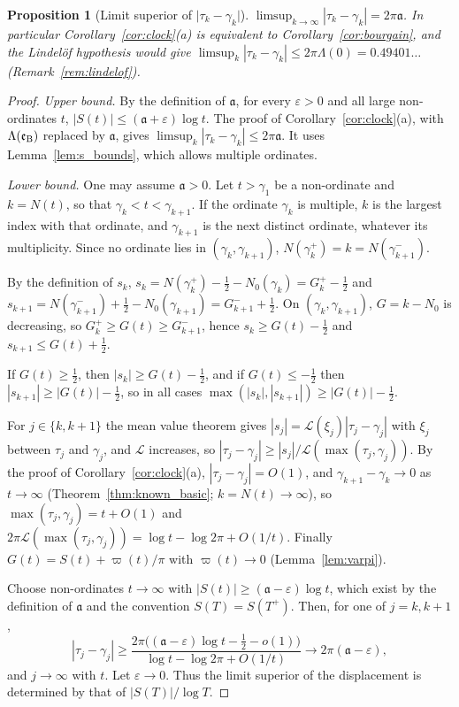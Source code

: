 \documentclass[11pt,a4paper]{article}
\makeatletter
\numberwithin{equation}{section}
\DeclareRobustCommand{\CGref}[1]{\ref{#1}}
\let\CG@origref\ref
\newcommand{\CG@gettip}[1]{\@ifundefined{CGTip@#1}{#1}{\csname CGTip@#1\endcsname}}
\DeclareRobustCommand{\CGref}[1]{\pdftooltip{\CG@origref{#1}}{\CG@gettip{#1}}}
\newtheorem{proposition}[theorem]{Proposition}
\theoremstyle{definition}
\theoremstyle{remark}
\newcommand{\Nz}{N_0} %
\newcommand{\lL}{\mathcal L}
\newcommand{\eB}{\mathfrak e_{\rm B}}
\makeatother
\begin{document}
\begin{proposition}[Limit superior of $\lvert\tau_k-\gamma_k\rvert$]\label{prop:clock_sharp}
$\limsup_{k\to\infty}|\tau_k-\gamma_k|=2\pi\mathfrak a$. In particular Corollary~\CGref{cor:clock}(a) is equivalent to Corollary~\CGref{cor:bourgain}, and the Lindel\"of hypothesis would give $\limsup_k|\tau_k-\gamma_k|\le2\pi\Lambda(0)=0.49401\ldots$ (Remark~\CGref{rem:lindelof}).
\end{proposition}

\begin{proof}
\emph{Upper bound.} By the definition of $\mathfrak a$, for every $\varepsilon>0$ and all large non-ordinates $t$, $|S(t)|\le(\mathfrak a+\varepsilon)\log t$. The proof of Corollary~\CGref{cor:clock}(a), with $\Lambda(\eB)$ replaced by $\mathfrak a$, gives $\limsup_k|\tau_k-\gamma_k|\le2\pi\mathfrak a$. It uses Lemma~\CGref{lem:s_bounds}, which allows multiple ordinates.

\emph{Lower bound.} One may assume $\mathfrak a>0$. Let $t>\gamma_1$ be a non-ordinate and $k=N(t)$, so that $\gamma_k<t<\gamma_{k+1}$. If the ordinate $\gamma_k$ is multiple, $k$ is the largest index with that ordinate, and $\gamma_{k+1}$ is the next distinct ordinate, whatever its multiplicity. Since no ordinate lies in $(\gamma_k,\gamma_{k+1})$, $N(\gamma_k^+)=k=N(\gamma_{k+1}^-)$.

By the definition of $s_k$, $s_k=N(\gamma_k^+)-\frac12-\Nz(\gamma_k)=G_k^+-\frac12$ and $s_{k+1}=N(\gamma_{k+1}^-)+\frac12-\Nz(\gamma_{k+1})=G_{k+1}^-+\frac12$. On $(\gamma_k,\gamma_{k+1})$, $G=k-\Nz$ is decreasing, so $G_k^+\ge G(t)\ge G_{k+1}^-$, hence $s_k\ge G(t)-\frac12$ and $s_{k+1}\le G(t)+\frac12$.

If $G(t)\ge\frac12$, then $|s_k|\ge G(t)-\frac12$, and if $G(t)\le-\frac12$ then $|s_{k+1}|\ge|G(t)|-\frac12$, so in all cases $\max(|s_k|,|s_{k+1}|)\ge|G(t)|-\frac12$.

For $j\in\{k,k+1\}$ the mean value theorem gives $|s_j|=\lL(\xi_j)|\tau_j-\gamma_j|$ with $\xi_j$ between $\tau_j$ and $\gamma_j$, and $\lL$ increases, so $|\tau_j-\gamma_j|\ge|s_j|/\lL(\max(\tau_j,\gamma_j))$. By the proof of Corollary~\CGref{cor:clock}(a), $|\tau_j-\gamma_j|=O(1)$, and $\gamma_{k+1}-\gamma_k\to0$ as $t\to\infty$ (Theorem~\CGref{thm:known_basic}; $k=N(t)\to\infty$), so $\max(\tau_j,\gamma_j)=t+O(1)$ and $2\pi\lL(\max(\tau_j,\gamma_j))=\log t-\log2\pi+O(1/t)$. Finally $G(t)=S(t)+\varpi(t)/\pi$ with $\varpi(t)\to0$ (Lemma~\CGref{lem:varpi}).

Choose non-ordinates $t\to\infty$ with $|S(t)|\ge(\mathfrak a-\varepsilon)\log t$, which exist by the definition of $\mathfrak a$ and the convention $S(T)=S(T^+)$. Then, for one of $j=k,k+1$,
\[
|\tau_j-\gamma_j|\ge\frac{2\pi\bigl((\mathfrak a-\varepsilon)\log t-\frac12-o(1)\bigr)}{\log t-\log2\pi+O(1/t)}\longrightarrow2\pi(\mathfrak a-\varepsilon),
\]
and $j\to\infty$ with $t$. Let $\varepsilon\to0$. Thus the limit superior of the displacement is determined by that of $|S(T)|/\log T$.
\end{proof}
\end{document}
